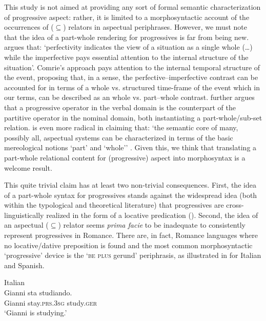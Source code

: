 \documentclass[output=paper,modfonts,nonflat,newtxmath,colorlinks,citecolor=brown]{langsci/langscibook}
\begin{document}
This study is not aimed at providing any sort of formal semantic characterization of progressive aspect: rather, it is limited to a morphosyntactic account of the occurrences of (${\subseteq}$) relators in aspectual periphrases. However, we must note that the idea of a part-whole rendering for progressives is far from being new. \citet[16]{Comrie1976} argues that: ‘perfectivity indicates the view of a situation as a single whole (…) while the imperfective pays essential attention to the internal structure of the situation’. Comrie’s approach pays attention to the internal temporal structure of the event, proposing that, in a sense, the perfective–imperfective contrast can be accounted for in terms of a  whole vs. structured time-frame of the event which in our terms, can be described as an whole {vs}. part–whole contrast. \citet{Bach1986} further argues that a progressive operator in the verbal domain is the counterpart of the partitive operator in the nominal domain, both instantiating a part-whole/sub-set relation. \citet{Filip1999} is even more radical in claiming that: ‘the semantic core of many, possibly all, aspectual systems can be characterized in terms of the basic mereological notions ‘part’ and ‘whole’’ \citep[158]{Filip1999}. Given this, we think that translating a part-whole relational content for (progressive) aspect into morphosyntax is a welcome result.  

This quite trivial claim has at least two non-trivial consequences. First, the idea of a part-whole syntax for progressives stands against the widespread idea (both within the typological and theoretical literature) that progressives are cross-linguistically realized in the form of a locative predication (\citealt{MateuAmadas1999, BybeeEtAl1994, DemirdacheUribe-Etxebarria1997}).  Second, the idea of an aspectual (${\subseteq}$) relator seems \textit{prima facie} to be inadequate to consistently represent progressives in Romance. There are, in fact, Romance languages where no locative/dative preposition is found and the most common morphosyntactic ‘progressive’ device is the ‘\textsc{be plus} gerund’ periphrasis, as illustrated in  for Italian and Spanish. %

\ea%
    \label{ex:franco:9}
    \ea Italian\\\label{ex:franco:9a}
    \gll  Gianni sta studiando.  \\
         Gianni stay.\textsc{prs.3sg} study.\textsc{ger} \\
    \glt `Gianni is studying.'
    
\end{document}
